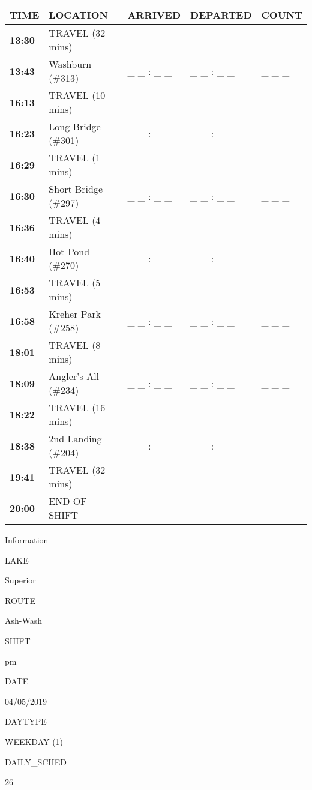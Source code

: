 \documentclass[]{article}
\begin{document}
\begin{tabular}{>{\bfseries}lllll}
\toprule
\textbf{TIME} & \textbf{LOCATION} & \textbf{ARRIVED} & \textbf{DEPARTED} & \textbf{COUNT}\\
\midrule
13:30 & TRAVEL (32 mins) &  &  & \\
13:43 & Washburn (\#313) & \_ \_ : \_ \_ & \_ \_ : \_ \_ & \_ \_ \_\\
16:13 & TRAVEL (10 mins) &  &  & \\
16:23 & Long Bridge (\#301) & \_ \_ : \_ \_ & \_ \_ : \_ \_ & \_ \_ \_\\
16:29 & TRAVEL (1 mins) &  &  & \\
16:30 & Short Bridge (\#297) & \_ \_ : \_ \_ & \_ \_ : \_ \_ & \_ \_ \_\\
16:36 & TRAVEL (4 mins) &  &  & \\
16:40 & Hot Pond (\#270) & \_ \_ : \_ \_ & \_ \_ : \_ \_ & \_ \_ \_\\
16:53 & TRAVEL (5 mins) &  &  & \\
16:58 & Kreher Park (\#258) & \_ \_ : \_ \_ & \_ \_ : \_ \_ & \_ \_ \_\\
18:01 & TRAVEL (8 mins) &  &  & \\
18:09 & Angler's All (\#234) & \_ \_ : \_ \_ & \_ \_ : \_ \_ & \_ \_ \_\\
18:22 & TRAVEL (16 mins) &  &  & \\
18:38 & 2nd Landing (\#204) & \_ \_ : \_ \_ & \_ \_ : \_ \_ & \_ \_ \_\\
19:41 & TRAVEL (32 mins) &  &  & \\
20:00 & END OF SHIFT &  &  & \\
\bottomrule
\end{tabular}\newpage

Information

LAKE

Superior

ROUTE

Ash-Wash

SHIFT

pm

DATE

04/05/2019

DAYTYPE

WEEKDAY (1)

DAILY\_SCHED

26

\vspace{24pt}
\end{document}
